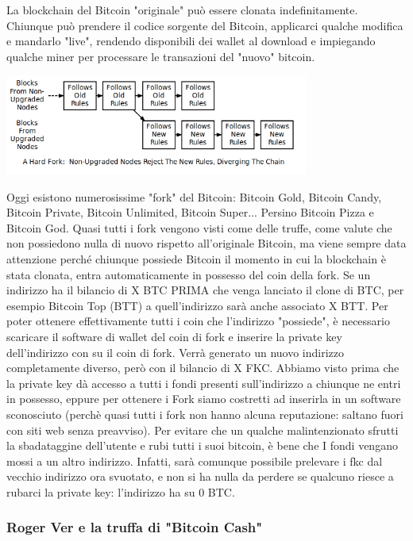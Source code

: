\documentclass {article}
\begin{document}
La blockchain del Bitcoin "originale" può essere clonata indefinitamente. Chiunque può prendere il codice sorgente del Bitcoin, applicarci qualche modifica e mandarlo "live", rendendo disponibili dei wallet al download e impiegando qualche miner per processare le transazioni del "nuovo" bitcoin.

\includegraphics [width = 10cm] {media/hard_fork.png}

Oggi esistono numerosissime "fork" del Bitcoin: Bitcoin Gold, Bitcoin Candy, Bitcoin Private, Bitcoin Unlimited, Bitcoin Super... Persino Bitcoin Pizza e Bitcoin God.
Quasi tutti i fork vengono visti come delle truffe, come valute che non possiedono nulla di nuovo rispetto all'originale Bitcoin, ma viene sempre data attenzione perché chiunque possiede Bitcoin il momento in cui la blockchain è stata clonata, entra automaticamente in possesso del coin della fork. Se un indirizzo ha il bilancio di X BTC PRIMA che venga lanciato il clone di BTC, per esempio Bitcoin Top (BTT) a quell'indirizzo sarà anche associato X BTT.
Per poter ottenere effettivamente tutti i coin che l'indirizzo "possiede", è necessario scaricare il software di wallet del coin di fork e inserire la private key dell'indirizzo con su il coin di fork.
Verrà generato un nuovo indirizzo completamente diverso, però con il bilancio di X FKC.
Abbiamo visto prima che la private key dà accesso a tutti i fondi presenti sull'indirizzo a chiunque ne entri in possesso, eppure per ottenere i Fork siamo costretti ad inserirla in un software sconosciuto (perchè quasi tutti i fork non hanno alcuna reputazione: saltano fuori con siti web senza preavviso).
Per evitare che un qualche malintenzionato sfrutti la sbadataggine dell'utente e rubi tutti i suoi bitcoin, è bene che I fondi vengano mossi a un altro indirizzo.
Infatti, sarà comunque possibile prelevare i fkc dal vecchio indirizzo ora svuotato, e non si ha nulla da perdere se qualcuno riesce a rubarci la private key: l'indirizzo ha su 0 BTC.

\subsubsection {Roger Ver e la truffa di "Bitcoin Cash"}
\end{document}
